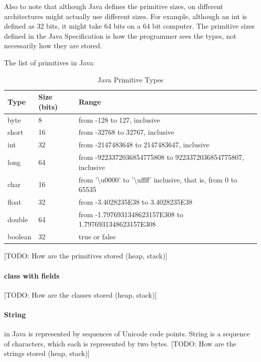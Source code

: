 Also to note that although Java defines the primitive sizes, on different architectures might actually use different sizes. For example, although an int is defined as 32 bits, it might take 64 bits on a 64 bit computer. The primitive sizes defined in the Java Specification is how the programmer sees the types, not necessarily how they are stored.

The list of primitives in Java\cite{gosling}:
\begin{table}[!htb]
\centering
\begin{tabulary}{\columnwidth}{ | p{0.1\columnwidth} | p{0.15\columnwidth} | p{0.55\columnwidth} |}
\hline
\textbf{Type} & \textbf{Size (bits)} & \textbf{Range} \\ \hline 
byte  & 8  & from -128 to 127, inclusive \\ \hline 
short & 16 & from -32768 to 32767, inclusive \\ \hline 
int   & 32 & from -2147483648 to 2147483647, inclusive \\ \hline 
long  & 64 & from -9223372036854775808 to 9223372036854775807, inclusive \\ \hline
char  & 16 & from '\textbackslash{}u0000' to '\textbackslash{}uffff' inclusive, that is, from 0 to 65535 \\ \hline 
float & 32 & from -3.4028235E38 to 3.4028235E38\footnotemark[3] \\ \hline
double & 64 &from -1.7976931348623157E308 to 1.7976931348623157E308\footnotemark[3] \\ \hline
boolean & 32\footnotemark[4] & true or false \\ \hline
\end{tabulary}
\caption{Java Primitive Types}\label{tab:java-primitive-types}
\end{table}

[TODO: How are the primitives stored (heap, stack)]
\paragraph{class with fields}
[TODO: How are the classes stored (heap, stack)]
\paragraph{String} in Java is represented by sequences of Unicode code points. String is a sequence of characters, which each is represented by two bytes. 
[TODO: How are the strings stored (heap, stack)]
